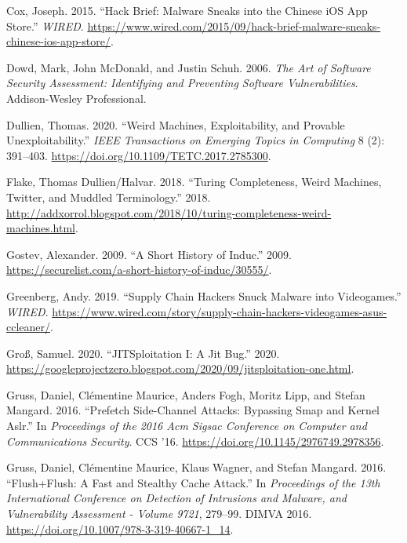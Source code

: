 \documentclass[a4paper,]{report}
\begin{document}
\leavevmode\hypertarget{ref-Cox2015}{}%
Cox, Joseph. 2015. ``Hack Brief: Malware Sneaks into the Chinese iOS App
Store.'' \emph{WIRED}.
\url{https://www.wired.com/2015/09/hack-brief-malware-sneaks-chinese-ios-app-store/}.

\leavevmode\hypertarget{ref-Dowd2006}{}%
Dowd, Mark, John McDonald, and Justin Schuh. 2006. \emph{The Art of
Software Security Assessment: Identifying and Preventing Software
Vulnerabilities}. Addison-Wesley Professional.

\leavevmode\hypertarget{ref-Dullien2020}{}%
Dullien, Thomas. 2020. ``Weird Machines, Exploitability, and Provable
Unexploitability.'' \emph{IEEE Transactions on Emerging Topics in
Computing} 8 (2): 391--403.
\url{https://doi.org/10.1109/TETC.2017.2785300}.

\leavevmode\hypertarget{ref-Dullien2018}{}%
Flake, Thomas Dullien/Halvar. 2018. ``Turing Completeness, Weird
Machines, Twitter, and Muddled Terminology.'' 2018.
\url{http://addxorrol.blogspot.com/2018/10/turing-completeness-weird-machines.html}.

\leavevmode\hypertarget{ref-Gostev2009}{}%
Gostev, Alexander. 2009. ``A Short History of Induc.'' 2009.
\url{https://securelist.com/a-short-history-of-induc/30555/}.

\leavevmode\hypertarget{ref-Greenberg2019}{}%
Greenberg, Andy. 2019. ``Supply Chain Hackers Snuck Malware into
Videogames.'' \emph{WIRED}.
\url{https://www.wired.com/story/supply-chain-hackers-videogames-asus-ccleaner/}.

\leavevmode\hypertarget{ref-Grouxdf2020}{}%
Groß, Samuel. 2020. ``JITSploitation I: A Jit Bug.'' 2020.
\url{https://googleprojectzero.blogspot.com/2020/09/jitsploitation-one.html}.

\leavevmode\hypertarget{ref-Gruss2016}{}%
Gruss, Daniel, Clémentine Maurice, Anders Fogh, Moritz Lipp, and Stefan
Mangard. 2016. ``Prefetch Side-Channel Attacks: Bypassing Smap and
Kernel Aslr.'' In \emph{Proceedings of the 2016 Acm Sigsac Conference on
Computer and Communications Security}. CCS '16.
\url{https://doi.org/10.1145/2976749.2978356}.

\leavevmode\hypertarget{ref-Gruss2016a}{}%
Gruss, Daniel, Clémentine Maurice, Klaus Wagner, and Stefan Mangard.
2016. ``Flush+Flush: A Fast and Stealthy Cache Attack.'' In
\emph{Proceedings of the 13th International Conference on Detection of
Intrusions and Malware, and Vulnerability Assessment - Volume 9721},
279--99. DIMVA 2016. \url{https://doi.org/10.1007/978-3-319-40667-1_14}.
\end{document}

